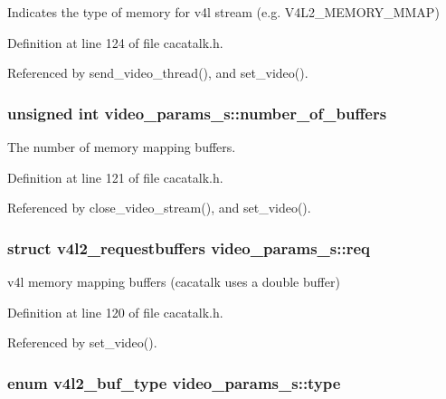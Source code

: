 \-Indicates the type of memory for v4l stream (e.\-g. \-V4\-L2\-\_\-\-M\-E\-M\-O\-R\-Y\-\_\-\-M\-M\-A\-P) 



\-Definition at line 124 of file cacatalk.\-h.



\-Referenced by send\-\_\-video\-\_\-thread(), and set\-\_\-video().

\hypertarget{structvideo__params__s_a61f9d75862499eb015a76c40c58abbd3}{
\subsubsection[{number\-\_\-of\-\_\-buffers}]{\setlength{\rightskip}{0pt plus 5cm}unsigned int {\bf video\-\_\-params\-\_\-s\-::number\-\_\-of\-\_\-buffers}}}\label{structvideo__params__s_a61f9d75862499eb015a76c40c58abbd3}


\-The number of memory mapping buffers. 



\-Definition at line 121 of file cacatalk.\-h.



\-Referenced by close\-\_\-video\-\_\-stream(), and set\-\_\-video().

\hypertarget{structvideo__params__s_a2688c600ca2c6aa4cd2e87cca2fa7909}{
\subsubsection[{req}]{\setlength{\rightskip}{0pt plus 5cm}struct v4l2\-\_\-requestbuffers {\bf video\-\_\-params\-\_\-s\-::req}}}\label{structvideo__params__s_a2688c600ca2c6aa4cd2e87cca2fa7909}


v4l memory mapping buffers (cacatalk uses a double buffer) 



\-Definition at line 120 of file cacatalk.\-h.



\-Referenced by set\-\_\-video().

\hypertarget{structvideo__params__s_a0bf1de534c89c2e3fd2c0785cd3684c0}{
\subsubsection[{type}]{\setlength{\rightskip}{0pt plus 5cm}enum v4l2\-\_\-buf\-\_\-type {\bf video\-\_\-params\-\_\-s\-::type}}}\label{structvideo__params__s_a0bf1de534c89c2e3fd2c0785cd3684c0}


